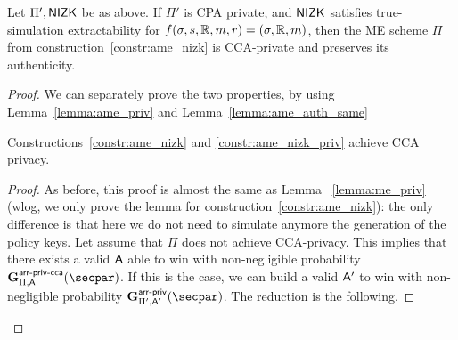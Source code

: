 \begin{theorem}\label{theo:ame_nizk_priv}
    Let $\Pi', \mathsf{NIZK}$ be as above.
    If $\Pi'$ is CPA private, and $\mathsf{NIZK}$ satisfies true-simulation extractability for $f(\sigma, s, \mathbb{R}, m, r) = (\sigma, \mathbb{R}, m)$, then the ME scheme $\Pi$ from construction~\ref{constr:ame_nizk} is CCA-private and preserves its authenticity.
\end{theorem}

\begin{proof}
    We can separately prove the two properties, by using Lemma~\ref{lemma:ame_priv} and Lemma~\ref{lemma:ame_auth_same}

    \begin{lemma}\label{lemma:ame_priv}
        Constructions~\ref{constr:ame_nizk} and \ref{constr:ame_nizk_priv} achieve CCA privacy.
        \begin{proof}
            As before, this proof is almost the same as Lemma ~\ref{lemma:me_priv} (wlog, we only prove the lemma for construction~\ref{constr:ame_nizk}): the only difference is that here we do not need to simulate anymore the generation of the policy keys.
            Let assume that $\Pi$ does not achieve CCA-privacy.
            This implies that there exists a valid $\mathsf{A}$ able to win with non-negligible probability $\NISHmatchgamecca{\arranged}_{\Pi, \adversary}(\secpar)$.
            If this is the case, we can build a valid $\mathsf{A}'$ to win with non-negligible probability $\NISHmatchgame{\arranged}_{\Pi', \adversary'}(\secpar)$.
            The reduction is the following.


\end{proof}
\end{lemma}
\end{proof}
